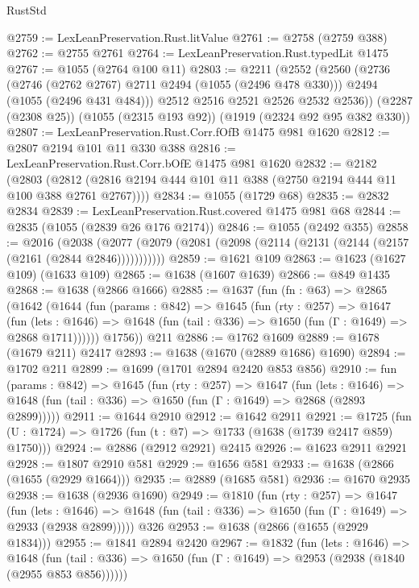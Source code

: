 \begin{lexlean}{RustStd}
\begin{coremodule}
@2759 := LexLeanPreservation.Rust.litValue
@2761 := @2758 (@2759 @388)
@2762 := @2755 @2761
@2764 := LexLeanPreservation.Rust.typedLit @1475
@2767 := @1055 (@2764 @100 @11)
@2803 := @2211
    (@2552
      (@2560
        (@2736
          (@2746 (@2762 @2767) @2711 @2494 (@1055 (@2496 @478 @330)))
          @2494
          (@1055 (@2496 @431 @484)))
        @2512
        @2516
        @2521
        @2526
        @2532
        @2536))
    (@2287 (@2308 @25))
    (@1055 (@2315 @193 @92))
    (@1919 (@2324 @92 @95 @382 @330))
@2807 := LexLeanPreservation.Rust.Corr.fOfB @1475 @981 @1620
@2812 := @2807 @2194 @101 @11 @330 @388
@2816 := LexLeanPreservation.Rust.Corr.bOfE @1475 @981 @1620
@2832 := @2182
    (@2803 (@2812 (@2816 @2194 @444 @101 @11 @388 (@2750 @2194 @444 @11 @100 @388 @2761 @2767))))
@2834 := @1055 (@1729 @68)
@2835 := @2832 @2834
@2839 := LexLeanPreservation.Rust.covered @1475 @981 @68
@2844 := @2835 (@1055 (@2839 @26 @176 @2174))
@2846 := @1055 (@2492 @355)
@2858 := @2016
    (@2038 (@2077 (@2079 (@2081 (@2098 (@2114 (@2131 (@2144 (@2157 (@2161 (@2844 @2846)))))))))))
@2859 := @1621 @109
@2863 := @1623 (@1627 @109) (@1633 @109)
@2865 := @1638 (@1607 @1639)
@2866 := @849 @1435
@2868 := @1638 (@2866 @1666)
@2885 := @1637
    (fun (fn : @63) =>
    @2865
      (@1642
        (@1644
          (fun (params : @842) =>
          @1645
            (fun (rty : @257) =>
            @1647
              (fun (lets : @1646) =>
              @1648 (fun (tail : @336) => @1650 (fun (Γ : @1649) => @2868 @1711))))))
        @1756))
    @211
@2886 := @1762 @1609
@2889 := @1678 (@1679 @211) @2417
@2893 := @1638 (@1670 (@2889 @1686) @1690)
@2894 := @1702 @211
@2899 := @1699 (@1701 @2894 @2420 @853 @856)
@2910 := fun (params : @842) =>
  @1645
    (fun (rty : @257) =>
    @1647
      (fun (lets : @1646) =>
      @1648 (fun (tail : @336) => @1650 (fun (Γ : @1649) => @2868 (@2893 @2899)))))
@2911 := @1644 @2910
@2912 := @1642 @2911
@2921 := @1725 (fun (U : @1724) => @1726 (fun (t : @7) => @1733 (@1638 (@1739 @2417 @859) @1750)))
@2924 := @2886 (@2912 @2921) @2415
@2926 := @1623 @2911 @2921
@2928 := @1807 @2910 @581
@2929 := @1656 @581
@2933 := @1638 (@2866 (@1655 (@2929 @1664)))
@2935 := @2889 (@1685 @581)
@2936 := @1670 @2935
@2938 := @1638 (@2936 @1690)
@2949 := @1810
    (fun (rty : @257) =>
    @1647
      (fun (lets : @1646) =>
      @1648 (fun (tail : @336) => @1650 (fun (Γ : @1649) => @2933 (@2938 @2899)))))
    @326
@2953 := @1638 (@2866 (@1655 (@2929 @1834)))
@2955 := @1841 @2894 @2420
@2967 := @1832
    (fun (lets : @1646) =>
    @1648 (fun (tail : @336) => @1650 (fun (Γ : @1649) => @2953 (@2938 (@1840 (@2955 @853 @856))))))

\end{coremodule}
\end{lexlean}
